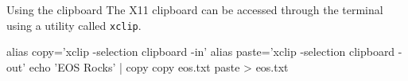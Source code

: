 \begin{block}{Using the clipboard}
  The X11 clipboard can be accessed through the terminal using a utility called \texttt{xclip}.
  \begin{bashcode}
    alias copy='xclip -selection clipboard -in'
    alias paste='xclip -selection clipboard -out'
    echo 'EOS Rocks' | copy
    copy eos.txt
    paste > eos.txt
  \end{bashcode}
\end{block}
